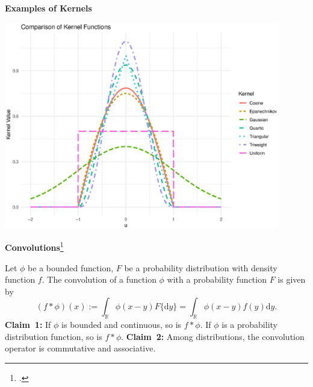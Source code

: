 \documentclass[19pt,landscape]{article}
\newcommand{\R}{\mathbb{R}}
\begin{document}
\newpage
{\LARGE{\textbf{Examples of Kernels}}}
\vskip25pt
   
\includegraphics[width=0.9\textwidth,height=0.5\textwidth]{kernel_comparison.eps}

\newpage
{\LARGE\centerline{\textbf{Convolutions}\footnote{\cite[Chapter V, Section~4]{fellerv2}.} }}
\vskip25pt
\begin{minipage}{0.9\textwidth}
    \Large 
    Let $\phi$ be a bounded function, $F$ be a probability distribution with density function $f$. The convolution of a function $\phi$ with a probability function $F$ is given by 
    \begin{equation}
        \left(f*\phi\right)(x):=\int_{\R}\phi(x-y)F\{\mathrm{d}y\}=\int_{\R}\phi(x-y)f(y)\mathrm{d}y.
    \end{equation}
    {\bf Claim~1:} If $\phi$ is bounded and continuous, so is $f*\phi$. If $\phi$ is a probability distribution function, so is $f*\phi$.
    \vskip 5pt
    {\bf Claim~2:} Among distributions, the convolution operator is commutative and associative. 
\end{minipage}
\end{document}
